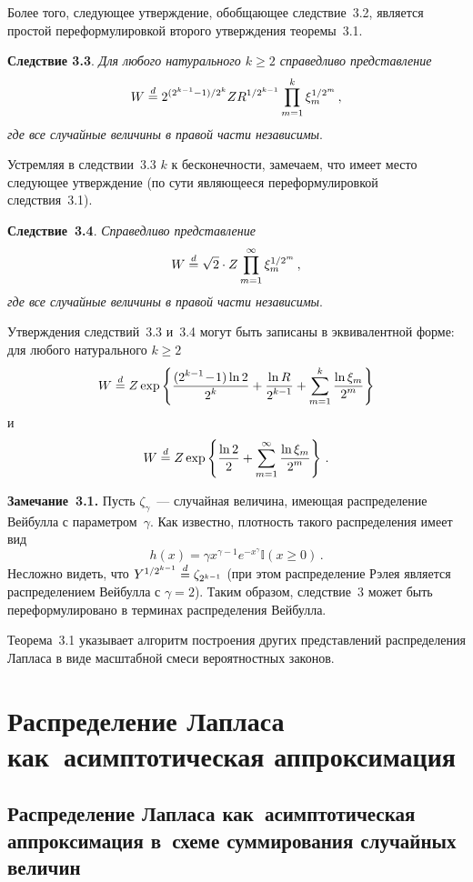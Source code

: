\begin{multicols}{2}
Более того, следующее утверждение, обоб\-ща\-ющее следствие~3.2,
является простой переформулировкой второго утверждения теоремы~3.1.

\medskip

\noindent
{\bf Следствие 3.3}. {\it Для любого натурального $k\ge2$
справедливо представление
$$
W\stackrel{d}{=} 2^{(2^{k-1}-1)/2^k} Z
R^{1/2^{k-1}} \prod_{m=1}^{k}\xi_m^{1/2^m}\,,
$$
где все случайные величины в правой части не\-за\-ви\-симы}.

\smallskip

Устремляя в следствии~3.3 $k$ к бесконечности, замечаем, что имеет место
следующее утверждение (по сути являющееся переформулировкой
следствия~3.1).

\medskip

\noindent
{\bf Следствие~3.4}. {\it Справедливо представление
$$
W\stackrel{d}{=} \sqrt{2}\cdot Z \prod_{m=1}^{\infty}\xi_m^{1/2^m}\,,
$$
где все случайные величины в правой части не\-за\-ви\-симы}.

\smallskip

Утверждения следствий~3.3 и~3.4 могут быть записаны в
эквивалентной форме: для любого натурального $k\ge 2$
$$
W\stackrel{d}{=} Z \exp\left\{\displaystyle\frac{\displaystyle (2^{k-1\!}-\!1)\ln 2\mathstrut}{\displaystyle 2^k\mathstrut}+ \displaystyle\frac{\displaystyle \ln
R\mathstrut}{\displaystyle 2^{k-1}\mathstrut}+\sum_{m=1}^{k}\displaystyle\frac{\displaystyle \ln\xi_m\mathstrut}{\displaystyle 2^m\mathstrut}\right \}
$$
и
$$
W\stackrel{d}{=} Z \exp\left\{\displaystyle\frac{\displaystyle \ln
2\mathstrut}{\displaystyle 2\mathstrut}+\sum_{m=1}^{\infty}\displaystyle\frac{\displaystyle \ln\xi_m\mathstrut}{\displaystyle 2^m\mathstrut}\right\}\,.
$$

\noindent
{\bf Замечание~3.1.} Пусть $\zeta_{\gamma}$~--- случайная величина,
имеющая распределение Вейбулла с параметром~$\gamma$. Как
известно, плотность такого распределения имеет вид
$$
h(x)=\gamma x^{\gamma-1}e^{-x^{\gamma}}\mathbb{I}(x\ge0)\,.
$$
Несложно видеть, что $Y^{1/2^{k-1}}\stackrel{d}{=} \zeta_{2^{k-1}}$ (при этом распределение
Рэлея является распределением Вейбулла с $\gamma=2$). Таким
образом, следствие~3 может быть переформулировано в терминах
распределения Вейбулла.


Теорема~3.1 указывает алгоритм построения других представлений
распределения Лапласа в виде масштабной смеси вероятностных
законов.

\section{Распределение Лапласа как~асимптотическая аппроксимация}

\subsection{Распределение Лапласа как~асимптотическая аппроксимация
в~схеме суммирования случайных величин}


\end{multicols}
